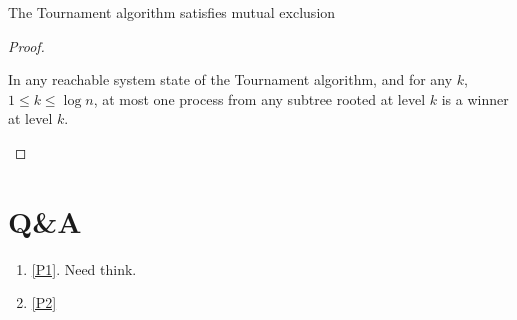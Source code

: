 \documentclass[11pt]{article}
\begin{document}
\begin{lemma}[]
The Tournament algorithm satisfies mutual exclusion
\end{lemma}

\begin{proof}
\begin{assertion}
\label{10.5.6}
In any reachable system state of the Tournament algorithm, and for any \(k\), \(1\le k\le\log n\), at
most one process from any subtree rooted at level \(k\) is a winner at level \(k\).
\end{assertion}
\end{proof}
\section{Q\&A}
\label{sec:org82e740d}
\begin{enumerate}
\item \ref{P1}. Need think.
\item \ref{P2}
\end{enumerate}
\end{document}
